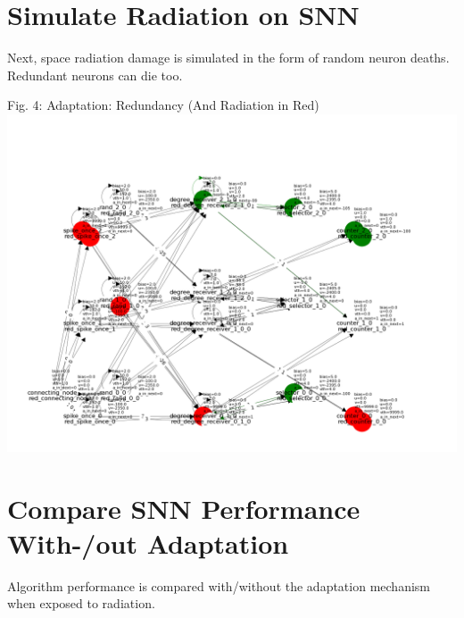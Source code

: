 \section{Simulate Radiation on SNN}\label{subsec:}
Next, space radiation damage is simulated in the form of random neuron deaths. Redundant neurons can die too. 
\begin{rudifig}{\hsize}{Fig. 4: Adaptation: Redundancy (And Radiation in Red)}
    \hspace{-1.5em}
    \includegraphics[width=1.1\linewidth]{latex/Images/rad_adapted.png}
    \label{fig:encoded_snn}
\end{rudifig}


\section{Compare SNN Performance With-/out Adaptation}\label{subsec:}
Algorithm performance is compared with/without the adaptation mechanism when exposed to radiation.\\